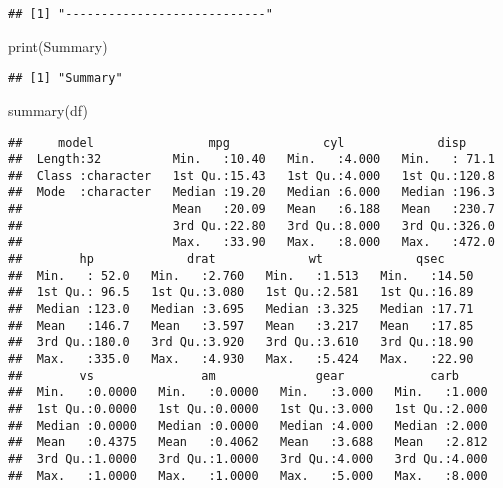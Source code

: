 \documentclass[
]{article}
\newenvironment{Shaded}{\begin{snugshade}}{\end{snugshade}}
\newcommand{\FunctionTok}[1]{\textcolor[rgb]{0.00,0.00,0.00}{#1}}
\newcommand{\NormalTok}[1]{#1}
\newcommand{\StringTok}[1]{\textcolor[rgb]{0.31,0.60,0.02}{#1}}
\begin{document}
\begin{verbatim}
## [1] "----------------------------"
\end{verbatim}

\begin{Shaded}
\begin{Highlighting}[]
\FunctionTok{print}\NormalTok{(}\StringTok{\textquotesingle{}Summary\textquotesingle{}}\NormalTok{)}
\end{Highlighting}
\end{Shaded}

\begin{verbatim}
## [1] "Summary"
\end{verbatim}

\begin{Shaded}
\begin{Highlighting}[]
\FunctionTok{summary}\NormalTok{(df)}
\end{Highlighting}
\end{Shaded}

\begin{verbatim}
##     model                mpg             cyl             disp      
##  Length:32          Min.   :10.40   Min.   :4.000   Min.   : 71.1  
##  Class :character   1st Qu.:15.43   1st Qu.:4.000   1st Qu.:120.8  
##  Mode  :character   Median :19.20   Median :6.000   Median :196.3  
##                     Mean   :20.09   Mean   :6.188   Mean   :230.7  
##                     3rd Qu.:22.80   3rd Qu.:8.000   3rd Qu.:326.0  
##                     Max.   :33.90   Max.   :8.000   Max.   :472.0  
##        hp             drat             wt             qsec      
##  Min.   : 52.0   Min.   :2.760   Min.   :1.513   Min.   :14.50  
##  1st Qu.: 96.5   1st Qu.:3.080   1st Qu.:2.581   1st Qu.:16.89  
##  Median :123.0   Median :3.695   Median :3.325   Median :17.71  
##  Mean   :146.7   Mean   :3.597   Mean   :3.217   Mean   :17.85  
##  3rd Qu.:180.0   3rd Qu.:3.920   3rd Qu.:3.610   3rd Qu.:18.90  
##  Max.   :335.0   Max.   :4.930   Max.   :5.424   Max.   :22.90  
##        vs               am              gear            carb      
##  Min.   :0.0000   Min.   :0.0000   Min.   :3.000   Min.   :1.000  
##  1st Qu.:0.0000   1st Qu.:0.0000   1st Qu.:3.000   1st Qu.:2.000  
##  Median :0.0000   Median :0.0000   Median :4.000   Median :2.000  
##  Mean   :0.4375   Mean   :0.4062   Mean   :3.688   Mean   :2.812  
##  3rd Qu.:1.0000   3rd Qu.:1.0000   3rd Qu.:4.000   3rd Qu.:4.000  
##  Max.   :1.0000   Max.   :1.0000   Max.   :5.000   Max.   :8.000
\end{verbatim}
\end{document}
